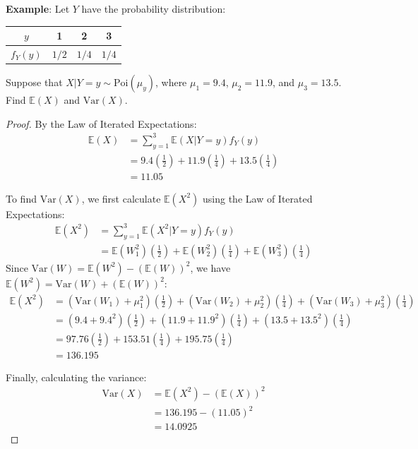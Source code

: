 \documentclass{article}
\newcommand{\E}{\mathbb{E}}
\newcommand{\Var}{\mathrm{Var}}
\begin{document}
\newpage
\noindent \textbf{Example}: Let $Y$ have the probability distribution:
\begin{center}
    \begin{tabular}{c|ccc}
        $y$ & 1 & 2 & 3 \\ \hline
        $f_Y(y)$ & $1/2$ & $1/4$ & $1/4$
    \end{tabular}
\end{center}
Suppose that $X|Y=y \sim \text{Poi}(\mu_y)$, where $\mu_1=9.4$, $\mu_2=11.9$, and $\mu_3=13.5$. Find $\E(X)$ and $\Var(X)$.
\begin{proof}
By the Law of Iterated Expectations:
\begin{align*}
    \E(X) &= \sum_{y=1}^{3} \E(X|Y=y) f_Y(y) \\
          &= 9.4\left(\frac{1}{2}\right) + 11.9\left(\frac{1}{4}\right) + 13.5\left(\frac{1}{4}\right) \\
          &= 11.05
\end{align*}

\noindent To find $\Var(X)$, we first calculate $\E(X^2)$ using the Law of Iterated Expectations:
\begin{align*}
    \E(X^2) &= \sum_{y=1}^{3} \E(X^2|Y=y) f_Y(y) \\
            &= \E(W_1^2)\left(\frac{1}{2}\right) + \E(W_2^2)\left(\frac{1}{4}\right) + \E(W_3^2)\left(\frac{1}{4}\right)
\end{align*}
Since $\Var(W) = \E(W^2) - (\E(W))^2$, we have $\E(W^2) = \Var(W) + (\E(W))^2$:
\begin{align*}
    \E(X^2) &= \left(\Var(W_1) + \mu_1^2\right)\left(\frac{1}{2}\right) + \left(\Var(W_2) + \mu_2^2\right)\left(\frac{1}{4}\right) + \left(\Var(W_3) + \mu_3^2\right)\left(\frac{1}{4}\right) \\
            &= (9.4 + 9.4^2)\left(\frac{1}{2}\right) + (11.9 + 11.9^2)\left(\frac{1}{4}\right) + (13.5 + 13.5^2)\left(\frac{1}{4}\right) \\
            &= 97.76\left(\frac{1}{2}\right) + 153.51\left(\frac{1}{4}\right) + 195.75\left(\frac{1}{4}\right) \\
            &= 136.195
\end{align*}

\noindent Finally, calculating the variance:
\begin{align*}
    \Var(X) &= \E(X^2) - (\E(X))^2 \\
            &= 136.195 - (11.05)^2 \\
            &= 14.0925
\end{align*}
\end{proof}
\end{document}
